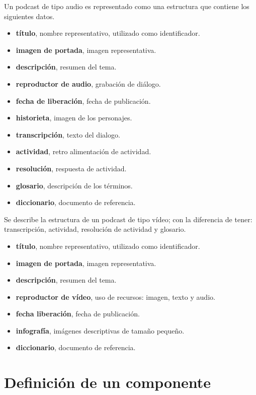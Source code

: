 Un podcast de tipo audio es representado como una estructura que contiene los
siguientes datos.

\begin{itemize}

\item \textbf{título}, nombre representativo, utilizado como identificador.
\item \textbf{imagen de portada}, imagen representativa.
\item \textbf{descripción}, resumen del tema.
\item \textbf{reproductor de audio}, grabación de diálogo.
\item \textbf{fecha de liberación}, fecha de publicación.
\item \textbf{historieta}, imagen de los personajes.
\item \textbf{transcripción}, texto del dialogo.
\item \textbf{actividad}, retro alimentación de actividad.
\item \textbf{resolución}, respuesta de actividad.
\item \textbf{glosario}, descripción de los términos.
\item \textbf{diccionario}, documento de referencia. 

\end{itemize}

Se describe la estructura de un podcast de tipo vídeo; con la diferencia de
tener: transcripción, actividad, resolución de actividad y glosario.

\begin{itemize}

\item \textbf{título}, nombre representativo, utilizado como identificador.
\item \textbf{imagen de portada}, imagen representativa.
\item \textbf{descripción}, resumen del tema.
\item \textbf{reproductor de vídeo}, uso de recursos: imagen, texto y audio.
\item \textbf{fecha liberación}, fecha de publicación.
\item \textbf{infografía}, imágenes descriptivas de tamaño pequeño.
\item \textbf{diccionario}, documento de referencia. 

\end{itemize}

\section{Definición de un componente}

